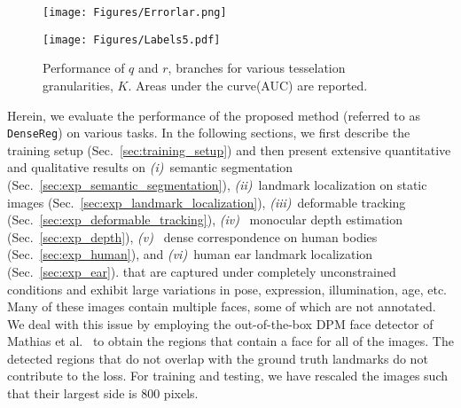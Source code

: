 \documentclass[10pt,twocolumn,letterpaper]{article}
\begin{document}
\begin{figure}[!htb]
    \centering
    \begin{minipage}{.7\linewidth}
        \centering
        \texttt{[image: Figures/Errorlar.png]}
    \end{minipage}%
    \begin{minipage}{0.3\linewidth}
        \centering
        \texttt{[image: Figures/Labels5.pdf]}
    \end{minipage}
    \vspace{-0.35cm}
    \caption{Performance of $q$ and $r$, branches for various tesselation granularities, $K$. Areas under the curve(AUC) are reported.}
    \vspace{-0.15cm}
    \label{fig:exp}
    \vspace{-0.15cm}

\end{figure}
Herein, we evaluate the performance of the proposed method (referred to as \texttt{DenseReg}) on various tasks. 
In the following sections, we first describe the training setup (Sec.~\ref{sec:training_setup}) and then present extensive quantitative and qualitative results on \emph{(i)}~semantic segmentation (Sec.~\ref{sec:exp_semantic_segmentation}), \emph{(ii)}~landmark localization on static images (Sec.~\ref{sec:exp_landmark_localization}), \emph{(iii)}~deformable tracking (Sec.~\ref{sec:exp_deformable_tracking}),  \emph{(iv)}~ monocular depth estimation (Sec.~\ref{sec:exp_depth}), \emph{(v)}~ dense correspondence on human bodies (Sec.~\ref{sec:exp_human}), and \emph{(vi)}~human ear landmark localization (Sec.~\ref{sec:exp_ear}).
that are captured under completely unconstrained conditions
and exhibit large variations in pose, expression, illumination,
age, etc.
 Many of these images contain multiple faces, some of which are not annotated. We deal with this issue by employing the out-of-the-box DPM face detector of Mathias et al.~\cite{mathias2014face} to obtain the regions that contain a face for all of the images. The detected regions that do not overlap with the ground truth landmarks do not contribute to the loss. For training and testing, we have rescaled the images such that their largest side is 800 pixels.
\end{document}
